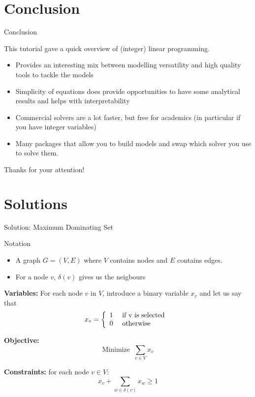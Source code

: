 \documentclass[10pt]{beamer}
\begin{document}
\section{Conclusion}

\begin{frame}[fragile]{Conclusion}

This tutorial gave a quick overview of (integer) linear programming.

\begin{itemize}
	\item Provides an interesting mix between modelling versatility and high quality tools to tackle the models
	\item Simplicity of equations does provide opportunities to have some analytical results and helps with interpretability
	\item Commercial solvers are a lot faster, but free for academics (in particular if you have integer variables)
	\item Many packages that allow you to build models and swap which solver you use to solve them.
\end{itemize}

\begin{center}\large Thanks for your attention!\end{center}

\end{frame}

\section*{Solutions}

\begin{frame}[fragile]{Solution: Maximum Dominating Set}

\begin{block}{Notation}
	\begin{itemize}
		\item A graph $G = (V,E)$ where $V$ contains nodes and $E$ contains edges.
		\item For a node $v$, $\delta(v)$ gives us the neigbours
	\end{itemize}
\end{block}


\textbf{Variables: }For each node $v$ in $V$, introduce a binary variable $x_v$ and let us say that
\[
	x_v = \left\{ \begin{array}{ll} 1 & \mbox{ if } $v$ \mbox{ is selected } \\ 0 & \mbox{ otherwise } \end{array} \right.
\]

\textbf{Objective: }
\[
	\mbox{Minimize }~\sum_{v \in V} x_v
\]

\textbf{Constraints: } for each node $v \in V$:
\[
	x_v + \sum_{w \in \delta(v)} x_w \geq 1
\]

\end{frame}

\end{document}
